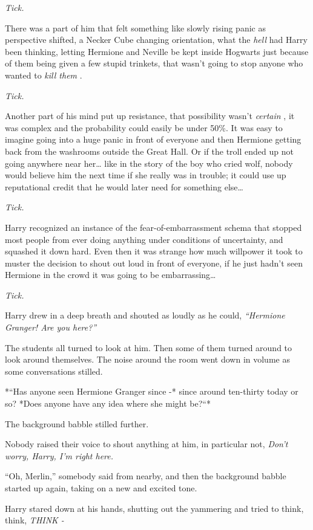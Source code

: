 \emph{Tick.}

There was a part of him that felt something like slowly rising panic as
perspective shifted, a Necker Cube changing orientation, what the
\emph{hell} had Harry been thinking, letting Hermione and Neville be
kept inside Hogwarts just because of them being given a few stupid
trinkets, that wasn't going to stop anyone who wanted to \emph{kill
them} .

\emph{Tick.}

Another part of his mind put up resistance, that possibility wasn't
\emph{certain} , it was complex and the probability could easily be
under 50\%. It was easy to imagine going into a huge panic in front of
everyone and then Hermione getting back from the washrooms outside the
Great Hall. Or if the troll ended up not going anywhere near her\ldots{}
like in the story of the boy who cried wolf, nobody would believe him
the next time if she really was in trouble; it could use up reputational
credit that he would later need for something else\ldots{}

\emph{Tick.}

Harry recognized an instance of the fear-of-embarrassment schema that
stopped most people from ever doing anything under conditions of
uncertainty, and squashed it down hard. Even then it was strange how
much willpower it took to muster the decision to shout out loud in front
of everyone, if he just hadn't seen Hermione in the crowd it was going
to be embarrassing\ldots{}

\emph{Tick.}

Harry drew in a deep breath and shouted as loudly as he could,
\emph{``Hermione Granger! Are you here?''}

The students all turned to look at him. Then some of them turned around
to look around themselves. The noise around the room went down in volume
as some conversations stilled.

*``Has anyone seen Hermione Granger since -* since around ten-thirty
today or so? *Does anyone have any idea where she might be?``*

The background babble stilled further.

Nobody raised their voice to shout anything at him, in particular not,
\emph{Don't worry, Harry, I'm right here.}

``Oh, Merlin,'' somebody said from nearby, and then the background
babble started up again, taking on a new and excited tone.

Harry stared down at his hands, shutting out the yammering and tried to
think, think, \emph{THINK -}

